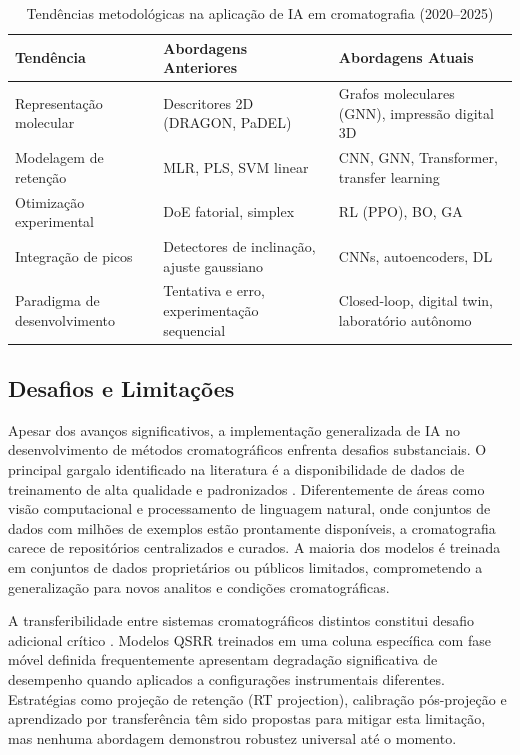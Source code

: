\documentclass[preprint,12pt]{elsarticle}
\begin{document}
\begin{table}[ht]
\caption{Tendências metodológicas na aplicação de IA em cromatografia (2020--2025)}
\label{tab:tendencias}
\centering
\small
\begin{tabular}{p{3.5cm}p{4.5cm}p{4.5cm}}
\toprule
Tendência & Abordagens Anteriores & Abordagens Atuais \\
\midrule
Representação molecular & Descritores 2D (DRAGON, PaDEL) & Grafos moleculares (GNN), impressão digital 3D \\
Modelagem de retenção & MLR, PLS, SVM linear & CNN, GNN, Transformer, transfer learning \\
Otimização experimental & DoE fatorial, simplex & RL (PPO), BO, GA \\
Integração de picos & Detectores de inclinação, ajuste gaussiano & CNNs, autoencoders, DL \\
Paradigma de desenvolvimento & Tentativa e erro, experimentação sequencial & Closed-loop, digital twin, laboratório autônomo \\
\bottomrule
\end{tabular}
\end{table}

\subsection{Desafios e Limitações}

Apesar dos avanços significativos, a implementação generalizada de IA no desenvolvimento de métodos cromatográficos enfrenta desafios substanciais. O principal gargalo identificado na literatura é a disponibilidade de dados de treinamento de alta qualidade e padronizados \cite{szucs2023, singh2024}. Diferentemente de áreas como visão computacional e processamento de linguagem natural, onde conjuntos de dados com milhões de exemplos estão prontamente disponíveis, a cromatografia carece de repositórios centralizados e curados. A maioria dos modelos é treinada em conjuntos de dados proprietários ou públicos limitados, comprometendo a generalização para novos analitos e condições cromatográficas.

A transferibilidade entre sistemas cromatográficos distintos constitui desafio adicional crítico \cite{szucs2023}. Modelos QSRR treinados em uma coluna específica com fase móvel definida frequentemente apresentam degradação significativa de desempenho quando aplicados a configurações instrumentais diferentes. Estratégias como projeção de retenção (RT projection), calibração pós-projeção e aprendizado por transferência têm sido propostas para mitigar esta limitação, mas nenhuma abordagem demonstrou robustez universal até o momento.
\end{document}
